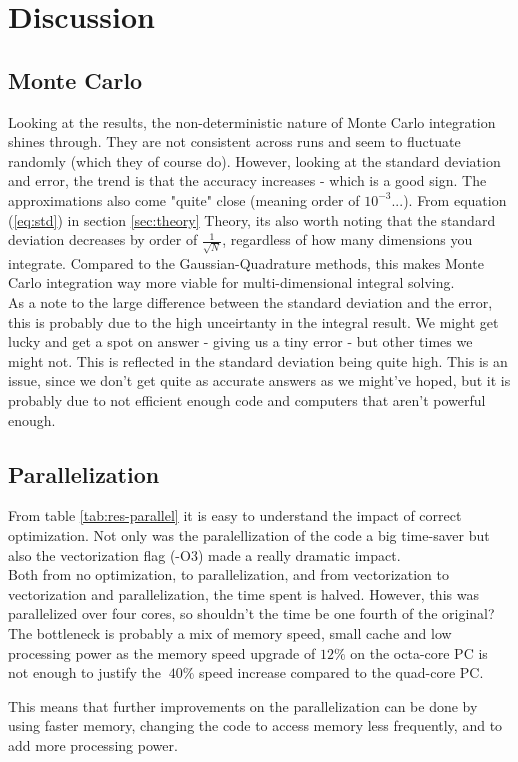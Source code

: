 \documentclass[../main.tex]{subfiles}
\begin{document}
\section{Discussion}
\subsection{Monte Carlo}
Looking at the results, the non-deterministic nature of Monte Carlo integration shines through. They are not consistent across runs and seem to fluctuate randomly (which they of course do). However, looking at the standard deviation and error, the trend is that the accuracy increases - which is a good sign. The approximations also come "quite" close (meaning order of $10^{-3}$...). From equation (\ref{eq:std}) in section \ref{sec:theory} Theory, its also worth noting that the standard deviation decreases by order of $\frac{1}{\sqrt{N}}$, regardless of how many dimensions you integrate. Compared to the Gaussian-Quadrature methods, this makes Monte Carlo integration way more viable for multi-dimensional integral solving. \\

As a note to the large difference between the standard deviation and the error, this is probably due to the high unceirtanty in the integral result. We might get lucky and get a spot on answer - giving us a tiny error - but other times we might not. This is reflected in the standard deviation being quite high. This is an issue, since we don't get quite as accurate answers as we might've hoped, but it is probably due to not efficient enough code and computers that aren't powerful enough.

\subsection{Parallelization}
From table \ref{tab:res-parallel} it is easy to understand the impact of correct optimization. Not only was the paralellization of the code a big time-saver but also the vectorization flag (-O3) made a really dramatic impact.\\

Both from no optimization, to parallelization, and from vectorization to vectorization and parallelization, the time spent is halved. However, this was parallelized over four cores, so shouldn't the time be one fourth of the original? The bottleneck is probably a mix of memory speed, small cache and low processing power as the memory speed upgrade of $12\%$ on the octa-core PC is not enough to justify the $~40\%$ speed increase compared to the quad-core PC.

This means that further improvements on the parallelization can be done by using faster memory, changing the code to access memory less frequently, and to add more processing power.
\end{document}

